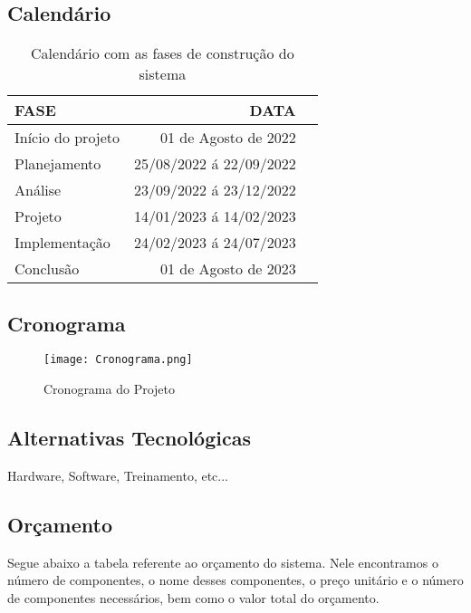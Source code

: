 \subsection{Calend\'{a}rio }

\begin{table}[H]
      \begin{center}
            \caption{Calendário com as fases de construção do sistema} \label{tabela1}
            \begin{tabular}{lrc}
                  \hline
                  FASE              & DATA                    \\
                  \hline
                  Início do projeto & 01 de Agosto de 2022    \\
                  Planejamento      & 25/08/2022 á 22/09/2022 \\
                  Análise           & 23/09/2022 á 23/12/2022 \\
                  Projeto           & 14/01/2023 á 14/02/2023 \\
                  Implementação     & 24/02/2023 á 24/07/2023 \\
                  Conclusão         & 01 de Agosto de 2023    \\
                  \hline
            \end{tabular}
      \end{center}
\end{table}

\subsection{Cronograma }
\begin{figure}[H]
      \begin{center}
            \caption{Cronograma do Projeto } \label{afp}

            \texttt{[image: Cronograma.png]} \\
      \end{center}
\end{figure}



\subsection{Alternativas Tecnol\'{o}gicas }
Hardware, Software, Treinamento, etc...

\subsection{Or\c{c}amento } \label{orcamento}
Segue abaixo a tabela referente ao orçamento do sistema. Nele encontramos o número de componentes, o nome desses componentes, o preço unitário e o número de componentes necessários, bem como o valor total do orçamento.

